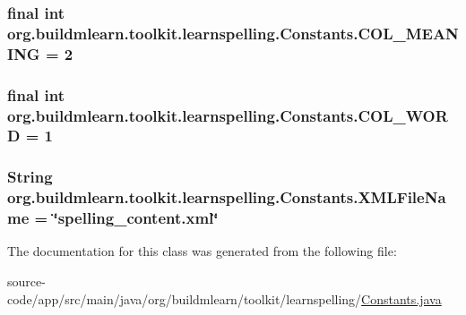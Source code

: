 \subsubsection[{\texorpdfstring{C\+O\+L\+\_\+\+M\+E\+A\+N\+I\+NG}{COL_MEANING}}]{\setlength{\rightskip}{0pt plus 5cm}final int org.\+buildmlearn.\+toolkit.\+learnspelling.\+Constants.\+C\+O\+L\+\_\+\+M\+E\+A\+N\+I\+NG = 2\hspace{0.3cm}{\ttfamily [static]}}\hypertarget{classorg_1_1buildmlearn_1_1toolkit_1_1learnspelling_1_1Constants_a439ff1d2fc63d5939a3a507bb11d8fed}{}\label{classorg_1_1buildmlearn_1_1toolkit_1_1learnspelling_1_1Constants_a439ff1d2fc63d5939a3a507bb11d8fed}
\subsubsection[{\texorpdfstring{C\+O\+L\+\_\+\+W\+O\+RD}{COL_WORD}}]{\setlength{\rightskip}{0pt plus 5cm}final int org.\+buildmlearn.\+toolkit.\+learnspelling.\+Constants.\+C\+O\+L\+\_\+\+W\+O\+RD = 1\hspace{0.3cm}{\ttfamily [static]}}\hypertarget{classorg_1_1buildmlearn_1_1toolkit_1_1learnspelling_1_1Constants_a63a5b9cadfe24d9f838df27c3d89ce22}{}\label{classorg_1_1buildmlearn_1_1toolkit_1_1learnspelling_1_1Constants_a63a5b9cadfe24d9f838df27c3d89ce22}
\subsubsection[{\texorpdfstring{X\+M\+L\+File\+Name}{XMLFileName}}]{\setlength{\rightskip}{0pt plus 5cm}String org.\+buildmlearn.\+toolkit.\+learnspelling.\+Constants.\+X\+M\+L\+File\+Name = \char`\"{}spelling\+\_\+content.\+xml\char`\"{}\hspace{0.3cm}{\ttfamily [static]}}\hypertarget{classorg_1_1buildmlearn_1_1toolkit_1_1learnspelling_1_1Constants_a2d1e69d562df209e512be480e8fd2e3d}{}\label{classorg_1_1buildmlearn_1_1toolkit_1_1learnspelling_1_1Constants_a2d1e69d562df209e512be480e8fd2e3d}


The documentation for this class was generated from the following file\+:\begin{DoxyCompactItemize}
\item 
source-\/code/app/src/main/java/org/buildmlearn/toolkit/learnspelling/\hyperlink{learnspelling_2Constants_8java}{Constants.\+java}\end{DoxyCompactItemize}
